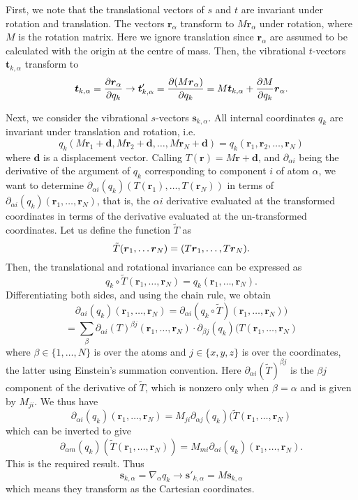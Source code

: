 \documentclass{article}
\newcommand{\vect}[1]{\boldsymbol{#1}}
\begin{document}
First, we note that the translational vectors of $s$ and $t$ are invariant under rotation and translation. The vectors $\vect{r}_\alpha$ transform to $M\vect{r}_\alpha$ under rotation, where $M$ is the rotation matrix. Here we ignore translation since $\vect{r}_\alpha$ are assumed to be calculated with the origin at the centre of mass. Then, the vibrational $t$-vectors $\vect{t}_{k, \alpha}$ transform to 
\[
\vect{t}_{k , \alpha} = \pdv{\vect{r}_\alpha}{q_k} \to \vect{t}'_{k, \alpha} = \pdv{(M\vect{r}_\alpha)}{q_k} = M \vect{t}_{k, \alpha} + \pdv{M}{q_k}\vect{r}_\alpha.
\]

Next, we consider the vibrational $s$-vectors $\vect{s}_{k, \alpha}$. All internal coordinates $q_k$ are invariant under translation and rotation, i.e.
\[
q_k(M\vect{r}_1 + \vect{d}, M\vect{r}_2 + \vect{d}, \ldots, M\vect{r}_N + \vect{d}) = q_k(\vect{r}_1, \vect{r}_2, \ldots, \vect{r}_N)
\]
where $\vect{d}$ is a displacement vector. Calling $T(\vect{r}) = M\vect{r} + \vect{d}$, and $\partial_{\alpha i}$ being the derivative of the argument of $q_k$ corresponding to component $i$ of atom $\alpha$, we want to determine $\partial_{\alpha i}(q_k)(T(\vect{r}_1), \ldots, T(\vect{r}_N))$ in terms of $\partial_{\alpha i}(q_k)(\vect{r}_1, \ldots, \vect{r}_N)$, that is, the $\alpha i$ derivative evaluated at the transformed coordinates in terms of the derivative evaluated at the un-transformed coordinates. Let us define the function $\tilde{T}$ as
\[
\Tilde{T}(\vect{r}_1, \ldots \vect{r}_N) = (T\vect{r}_1, \ldots, T\vect{r}_N).
\]
Then, the translational and rotational invariance can be expressed as 
\[
q_k \circ \tilde{T}(\vect{r}_1, \ldots, \vect{r}_N) = q_k(\vect{r}_1, \ldots, \vect{r}_N).
\]
Differentiating both sides, and using the chain rule, we obtain
\[
\partial_{\alpha i}(q_k)(\vect{r}_1, \ldots, \vect{r}_N) =\partial_{\alpha i} (q_k \circ \tilde{T})(\vect{r}_1, \ldots, \vect{r}_N)) 
\]
\[
= \sum_{\beta} \partial_{\alpha i}(T)^{\beta j}(\vect{r}_1, \ldots, \vect{r}_N)\cdot 
\partial_{\beta j}(q_k)(T(\vect{r}_1, \ldots, \vect{r}_N)
\]
where $\beta \in \{1, \ldots, N\}$ is over the atoms and $j \in \{x, y, z\}$ is over the coordinates, the latter using Einstein's summation convention. Here $\partial_{\alpha i}(\tilde{T})^{\beta j}$ is the $\beta j$ component of the derivative of $\tilde{T}$, which is nonzero only when $\beta =\alpha$ and is given by $M_{ji}$. We thus have 
\[
\partial_{\alpha i}(q_k)(\vect{r}_1, \ldots, \vect{r}_N) =  M_{ji}\partial_{\alpha j}(q_k)(\tilde{T}(\vect{r}_1, \ldots, \vect{r}_N)
\]
which can be inverted to give
\[
\partial_{\alpha m}(q_k)(\tilde{T}(\vect{r}_1, \ldots, \vect{r}_N)) = M_{mi}\partial_{\alpha i}(q_k)(\vect{r}_1, \ldots, \vect{r}_N).
\]
This is the required result. Thus
\[
\vect{s}_{k, \alpha} = \nabla_{\alpha}q_k \to \vect{s}'_{k, \alpha} = M\vect{s}_{k, \alpha}
\]
which means they transform as the Cartesian coordinates. 
\end{document}
